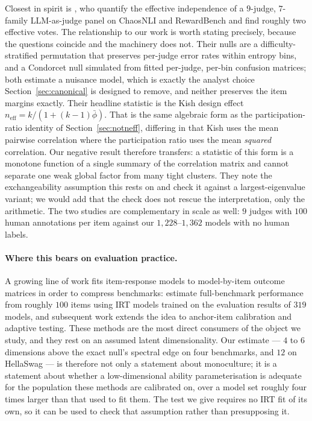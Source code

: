 \documentclass[pdflatex,sn-mathphys-ay]{sn-jnl}
\theoremstyle{thmstyleone}
\theoremstyle{thmstylethree}
\begin{document}
Closest in spirit is \citet{kohli2026nine}, who quantify the effective independence of a
$9$-judge, $7$-family LLM-as-judge panel on ChaosNLI and RewardBench and find roughly two
effective votes. The relationship to our work is worth stating precisely, because the questions
coincide and the machinery does not. Their nulls are a difficulty-stratified permutation that
preserves per-judge error rates within entropy bins, and a Condorcet null simulated from fitted
per-judge, per-bin confusion matrices; both estimate a nuisance model, which is exactly the
analyst choice Section~\ref{sec:canonical} is designed to remove, and neither preserves the item
margins exactly. Their headline statistic is the Kish design effect
$n_{\text{eff}} = k/(1+(k-1)\bar\phi)$. That is the same algebraic form as the participation-ratio
identity of Section~\ref{sec:notneff}, differing in that Kish uses the mean pairwise correlation
where the participation ratio uses the mean \emph{squared} correlation. Our negative result
therefore transfers: a statistic of this form is a monotone function of a single summary of the
correlation matrix and cannot separate one weak global factor from many tight clusters. They note
the exchangeability assumption this rests on and check it against a largest-eigenvalue variant;
we would add that the check does not rescue the interpretation, only the arithmetic. The two
studies are complementary in scale as well: $9$ judges with $100$ human annotations per item
against our $1{,}228$--$1{,}362$ models with no human labels.
\paragraph{Where this bears on evaluation practice.} A growing line of work fits item-response
models to model-by-item outcome matrices in order to compress benchmarks: \citet{polo2024tiny}
estimate full-benchmark performance from roughly $100$ items using IRT models trained on the
evaluation results of $319$ models, and subsequent work extends the idea to anchor-item
calibration and adaptive testing. These methods are the most direct consumers of the object we
study, and they rest on an assumed latent dimensionality. Our estimate --- $4$ to $6$ dimensions
above the exact null's spectral edge on four benchmarks, and $12$ on HellaSwag --- is therefore
not only a statement about monoculture; it is a statement about whether a low-dimensional ability
parameterisation is adequate for the population these methods are calibrated on, over a model set
roughly four times larger than that used to fit them. The test we give requires no IRT fit of its
own, so it can be used to check that assumption rather than presupposing it.
\end{document}
